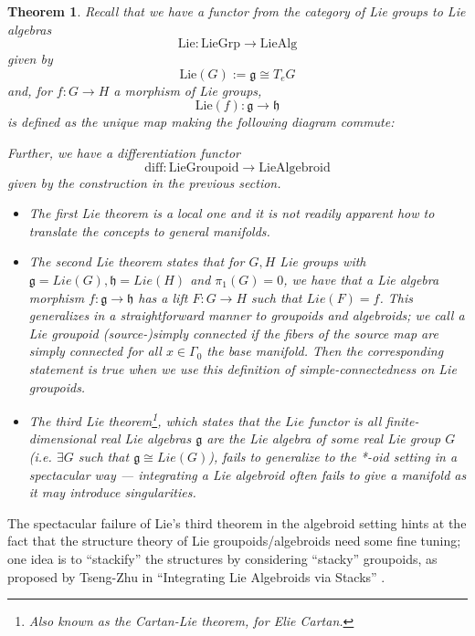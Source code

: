 \documentclass{tufte-handout}
\newtheorem{thrm}{Theorem}
\begin{document}
\begin{thrm}

Recall that we have a functor from the category of Lie groups to Lie algebras
$$
\mathrm{Lie}: \mathrm{LieGrp} \to \mathrm{LieAlg}
$$
given by
$$
\mathrm{Lie}(G) := \mathfrak{g} \cong T_e G
$$
and, for $f: G \to H$ a morphism of Lie groups,
$$
\mathrm{Lie}(f): \mathfrak{g} \to \mathfrak{h}
$$
is defined as the unique map making the following diagram commute:


Further, we have a \emph{differentiation} functor
$$
\mathrm{diff}: \mathrm{LieGroupoid} \to \mathrm{LieAlgebroid}
$$
given by the construction in the previous section.


\begin{itemize}
\item The first Lie theorem is a local one and it is not readily apparent how to translate the concepts to general manifolds.

\item The second Lie theorem states that for $G,H$ Lie groups with $\mathfrak{g} = Lie(G), \mathfrak{h} = Lie(H)$ and $\pi_1(G) = 0$, we have that a Lie algebra morphism $f: \mathfrak{g} \to \mathfrak{h}$ has a lift $F: G \to H$ such that $Lie(F) = f$. This generalizes in a straightforward manner to groupoids and algebroids; we call a Lie groupoid \emph{(source-)simply connected} if the fibers of the source map are simply connected for all $x \in \Gamma_0$ the base manifold. Then the corresponding statement is true when we use this definition of simple-connectedness on Lie groupoids.

\item The third Lie theorem\footnote{Also known as the \emph{Cartan-Lie} theorem, for Elie Cartan.}, which states that the $Lie$ functor is all finite-dimensional real Lie algebras $\mathfrak{g}$ are the Lie algebra of some real Lie group $G$ (i.e. $\exists G$ such that $\mathfrak{g} \cong Lie(G)$), fails to generalize to the *-oid setting in a spectacular way --- integrating a Lie algebroid often fails to give a manifold as it may introduce singularities. %

\end{itemize}
\end{thrm}

The spectacular failure of Lie's third theorem in the algebroid setting hints at the fact that the structure theory of Lie groupoids/algebroids need some fine tuning; one idea is to ``stackify'' the structures by considering ``stacky'' groupoids, as proposed by Tseng-Zhu in ``Integrating Lie Algebroids via Stacks'' \cite{tsengzhu}.
\end{document}
